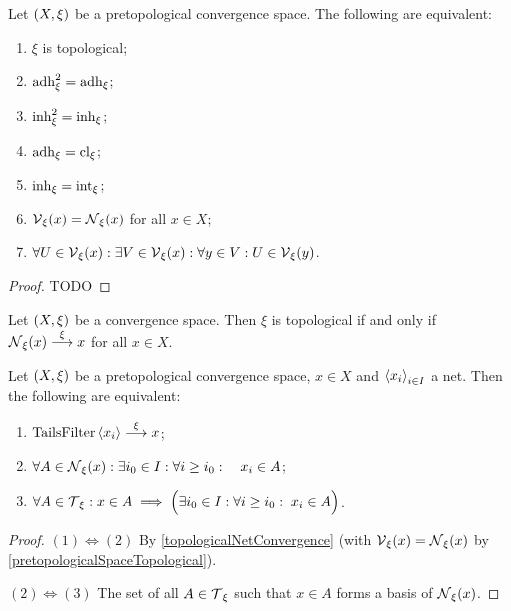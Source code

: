 \begin{proposition} \label{pretopologicalSpaceTopological}
Let $\left( X,\xi \right)$ be a pretopological convergence space. The following are equivalent:
\begin{enumerate}
\item $\xi$ is topological;
\item $\operatorname{adh}_\xi^2 = \operatorname{adh}_\xi$;
\item $\operatorname{inh}_\xi^2 = \operatorname{inh}_\xi$;
\item $\operatorname{adh}_\xi = \operatorname{cl}_\xi$;
\item $\operatorname{inh}_\xi = \operatorname{int}_\xi$;
\item $\operatorname{\mathcal{V}}_\xi(x) = \operatorname{\mathcal{N}}_\xi(x)$ for all $x\in X$;
\item $\forall U\in \operatorname{\mathcal{V}}_\xi(x): \exists V\in \operatorname{\mathcal{V}}_\xi(x): \forall y\in V: U\in\operatorname{\mathcal{V}}_\xi(y)$.
\end{enumerate}
\end{proposition}
\begin{proof}
TODO
\end{proof}
\begin{corollary}
Let $\left( X,\xi \right)$ be a convergence space. Then $\xi$ is topological \textup{if and only if} $\operatorname{\mathcal{N}}_\xi(x) \overset{\xi}{\longrightarrow} x$ for all $x\in X$.
\end{corollary}

\begin{lemma} \label{topologicalNetConvergence}
Let $\left( X,\xi \right)$ be a pretopological convergence space, $x\in X$ and $\left\langle x_i \right\rangle_{i\in I}$ a net. Then the following are equivalent:
\begin{enumerate}
\item $\operatorname{TailsFilter}\left\langle x_i \right\rangle \overset{\xi}{\longrightarrow} x$;
\item $\forall A\in \operatorname{\mathcal{N}}_\xi(x): \exists i_0\in I: \forall i \geq i_0: \quad x_i\in A$;
\item $\forall A\in \operatorname{\mathcal{T}}_\xi: x\in A \implies \Big(\exists i_0\in I: \forall i \geq i_0: \; x_i\in A\Big)$.
\end{enumerate}
\end{lemma}
\begin{proof}
$(1) \Leftrightarrow (2)$ By \ref{topologicalNetConvergence} (with $\operatorname{\mathcal{V}}_\xi(x) = \operatorname{\mathcal{N}}_\xi(x)$ by \ref{pretopologicalSpaceTopological}).


$(2) \Leftrightarrow (3)$ The set of all $A\in \operatorname{\mathcal{T}}_\xi$ such that $x\in A$ forms a basis of $\operatorname{\mathcal{N}}_\xi(x)$.
\end{proof}

